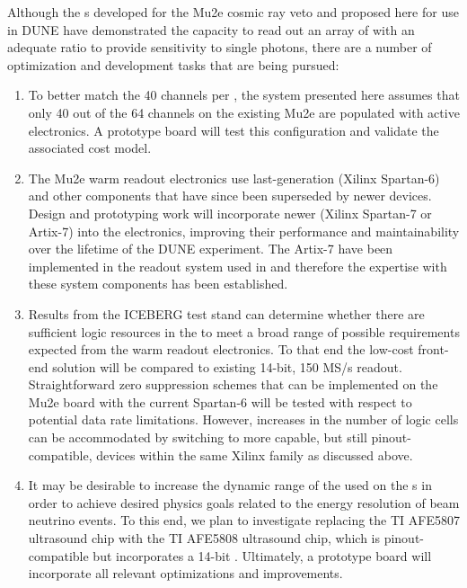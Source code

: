 Although the s developed for the Mu2e cosmic ray veto and proposed here for use in DUNE have
demonstrated the capacity to read out an array of  with an adequate  ratio to provide sensitivity to single photons, there are a number of optimization and development tasks that are being pursued:  

\begin{enumerate}
\item To better match the 40  channels per , the system presented here assumes that only 40 out of the 64 channels on the existing Mu2e  are populated with active electronics.  A prototype board will test this configuration and validate the associated cost model.

\item The Mu2e warm readout electronics use last-generation (Xilinx\texttrademark{} Spartan-6)  and other components that have since been superseded by newer devices.  Design and prototyping work will 
incorporate newer  (Xilinx Spartan-7 or Artix-7) into the electronics,
improving their performance and maintainability over the lifetime of the DUNE experiment. The Artix-7  have been implemented in the  readout system used in  and therefore the expertise with these system components has been established. 

\item Results from the ICEBERG test stand can determine whether there are sufficient logic resources in the  to meet a broad range of possible  requirements expected from the warm readout electronics. To that end the low-cost front-end solution will be compared to existing 14-bit, 150 MS/s  readout.  Straightforward zero suppression schemes that can be implemented on the Mu2e board with the current Spartan-6  will be tested with respect to potential  data rate limitations.  However, increases in the number of logic cells can be accommodated by switching to more capable, but still pinout-compatible, devices within the same Xilinx  family as discussed above.

\item It may be desirable to increase the dynamic range of the  used on the s in order to achieve desired physics goals related to the energy resolution of beam neutrino events.  To this end, we plan to investigate replacing the TI AFE5807 ultrasound chip with the TI AFE5808 ultrasound chip, which is pinout-compatible but incorporates a 14-bit .  Ultimately, a prototype board will incorporate all relevant optimizations and improvements.

\end{enumerate}
